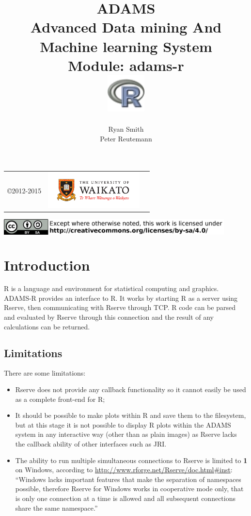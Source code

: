 \documentclass[a4paper]{book}
\title{
  \textbf{ADAMS} \\
  {\Large \textbf{A}dvanced \textbf{D}ata mining \textbf{A}nd \textbf{M}achine
  learning \textbf{S}ystem} \\
  {\Large Module: adams-r} \\
  \vspace{1cm}
  \includegraphics[width=2cm]{images/r-module.png} \\
}
\author{
  Ryan Smith \\
  Peter Reutemann
}
\begin{document}
\begin{titlepage}
\maketitle

\thispagestyle{empty}
\center
\begin{table}[b]
	\begin{tabular}{c l l}
		\parbox[c][2cm]{2cm}{\copyright 2012-2015} &
		\parbox[c][2cm]{5cm}{\includegraphics[width=5cm]{images/coat_of_arms.pdf}}
	\end{tabular}
	\includegraphics[width=12cm]{images/cc.png} \\
\end{table}

\end{titlepage}

\tableofcontents
\listoffigures

\chapter{Introduction}
R is a language and environment for statistical computing and graphics. ADAMS-R provides an interface to R. It works by starting R as a server using
Rserve\cite{rserve}, then communicating with Rserve through TCP. R code can be parsed and evaluated
by Rserve through this connection and the result of any calculations can be
returned. 

\section{Limitations}
There are some limitations: 
\begin{itemize}
	\item Rserve does not provide any callback
functionality so it cannot easily be used as a complete front-end for R;
	\item It should be possible to make plots within R and save them to the
filesystem, but at this stage it is not possible to display R plots within the ADAMS system in
any interactive way (other than as plain images) as Rserve lacks the callback
ability of other interfaces such as JRI.
\item The ability to run multiple simultaneous connections to Rserve is limited
to \textbf{1} on Windows, according to \url{http://www.rforge.net/Rserve/doc.html#inst}:
``Windows lacks important features that make the separation of namespaces possible, therefore Rserve for Windows works in cooperative mode only, that is only one connection at a time is allowed and all subsequent connections share the same namespace.''
\end{itemize}
\end{document}

